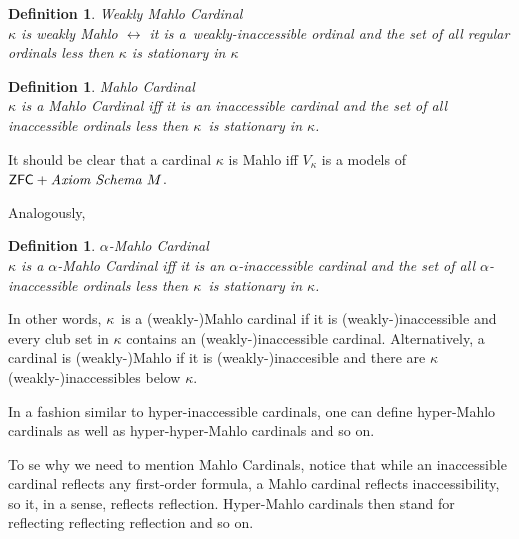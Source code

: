 \documentclass[12pt,a4paper]{article}
\newtheorem{definition}[theorem]{Definition}
\renewcommand{\iff}{\leftrightarrow}
\begin{document}
\begin{definition}{Weakly Mahlo Cardinal}\label{def:weakly_mahlo}\\
$\kappa$ is \emph{weakly Mahlo} $\iff$ it is a~weakly-inaccessible ordinal and the set of all regular ordinals less then $\kappa$ is stationary in $\kappa$
\end{definition}

\begin{definition}{Mahlo Cardinal}\label{def:mahlo_cardinal}\\
$\kappa$ is a \emph{Mahlo Cardinal} iff it is an inaccessible cardinal and the set of all inaccessible ordinals less then $\kappa$ is stationary in $\kappa$.
\end{definition}

It should be clear that a cardinal $\kappa$ is Mahlo iff $V_\kappa$ is a models of $\sf{ZFC} + \mbox{\emph{Axiom Schema $M$}}$.

Analogously, 
\begin{definition}{$\alpha$-Mahlo Cardinal}\label{def:alpha_mahlo_cardinal}\\
$\kappa$ is a \emph{$\alpha$-Mahlo Cardinal} iff it is an $\alpha$-inaccessible cardinal and the set of all $\alpha$-inaccessible ordinals less then $\kappa$ is stationary in $\kappa$.
\end{definition}

In other words, $\kappa$ is a (weakly-)Mahlo cardinal if it is (weakly-)inaccessible and every club set in $\kappa$ contains an (weakly-)inaccessible cardinal. Alternatively, a cardinal is (weakly-)Mahlo if it is (weakly-)inaccesible and there are $\kappa$ (weakly-)inaccessibles below $\kappa$.




In a fashion similar to hyper-inaccessible cardinals, one can define hyper-Mahlo cardinals as well as hyper-hyper-Mahlo cardinals and so on.

To se why we need to mention Mahlo Cardinals, notice that while an inaccessible cardinal reflects any first-order formula, a Mahlo cardinal reflects inaccessibility, so it, in a sense, reflects reflection. Hyper-Mahlo cardinals then stand for reflecting reflecting reflection and so on.
\end{document}
